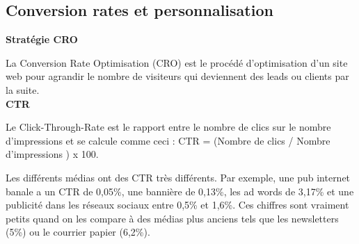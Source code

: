 \subsection{Conversion rates et personnalisation}

\textbf{Stratégie CRO}

La Conversion Rate Optimisation (CRO) est le procédé d'optimisation d'un site web pour agrandir le nombre de visiteurs qui deviennent des leads ou clients par la suite.\\

\textbf{CTR}

Le Click-Through-Rate est le rapport entre le nombre de clics sur le nombre d'impressions et se calcule comme ceci : CTR = (Nombre de clics / Nombre d'impressions ) x 100.

Les différents médias ont des CTR très différents. Par exemple, une pub internet banale a un CTR de 0,05\%, une bannière de 0,13\%, les ad words de 3,17\% et une publicité dans les réseaux sociaux entre 0,5\% et 1,6\%. Ces chiffres sont vraiment petits quand on les compare à des médias plus anciens tels que les newsletters (5\%) ou le courrier papier (6,2\%).
